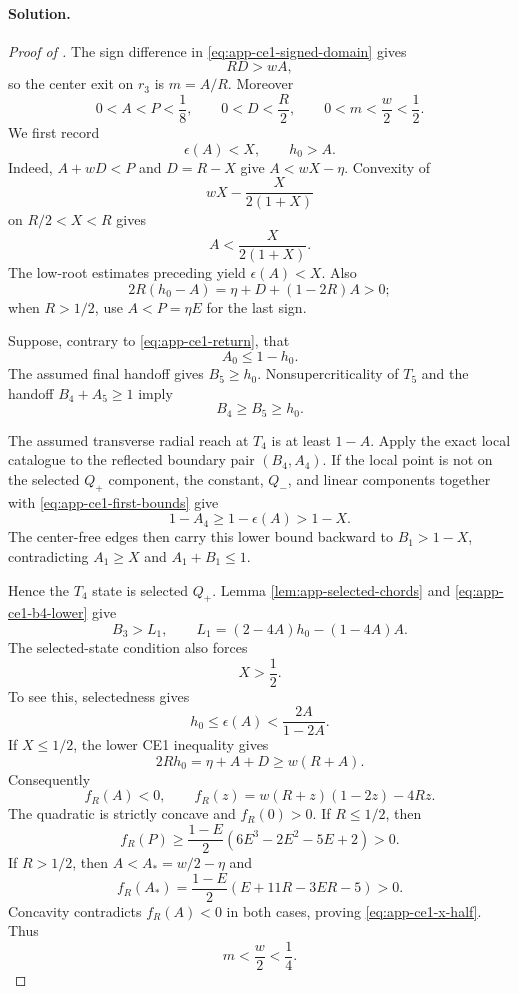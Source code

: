 

\paragraph{Solution.}

\begin{proof}[Proof of ]
The sign difference in \eqref{eq:app-ce1-signed-domain} gives
\[
 RD>wA,
\]
so the center exit on $r_3$ is $m=A/R$.  Moreover
\[
 0<A<P<\frac18,
 \qquad 0<D<\frac R2,
 \qquad 0<m<\frac w2<\frac12.
 \label{eq:app-ce1-elementary-bounds}
\]
We first record
\[
 \epsilon(A)<X,
 \qquad h_0>A.
 \label{eq:app-ce1-first-bounds}
\]
Indeed, $A+wD<P$ and $D=R-X$ give $A<wX-\eta$.  Convexity of
\[
 wX-\frac{X}{2(1+X)}
\]
on $R/2<X<R$ gives
\[
 A<\frac{X}{2(1+X)}.
\]
The low-root estimates preceding  yield
$\epsilon(A)<X$.  Also
\[
 2R(h_0-A)=\eta+D+(1-2R)A>0;
\]
when $R>1/2$, use $A<P=\eta E$ for the last sign.

Suppose, contrary to \eqref{eq:app-ce1-return}, that
\[
 A_0\le1-h_0.
 \label{eq:app-ce1-return-negation}
\]
The assumed final handoff gives $B_5\ge h_0$.
Nonsupercriticality of $T_5$ and the handoff $B_4+A_5\ge1$ imply
\[
 \boxed{B_4\ge B_5\ge h_0.}
 \label{eq:app-ce1-b4-lower}
\]

The assumed transverse radial reach at $T_4$ is at least $1-A$.  Apply the exact local
catalogue to the reflected boundary pair $(B_4,A_4)$.  If the local point is
not on the selected $Q_+$ component, the constant, $Q_-$, and linear
components together with \eqref{eq:app-ce1-first-bounds} give
\[
 1-A_4\ge1-\epsilon(A)>1-X.
\]
The center-free edges then carry this lower bound backward to
$B_1>1-X$, contradicting $A_1\ge X$ and
$A_1+B_1\le1$.

Hence the $T_4$ state is selected $Q_+$.  Lemma
\ref{lem:app-selected-chords} and \eqref{eq:app-ce1-b4-lower} give
\[
 B_3>L_1,
 \qquad
 L_1=(2-4A)h_0-(1-4A)A.
 \label{eq:app-ce1-l1}
\]
The selected-state condition also forces
\[
 \boxed{X>\frac12.}
 \label{eq:app-ce1-x-half}
\]
To see this, selectedness gives
\[
 h_0\le\epsilon(A)<\frac{2A}{1-2A}.
\]
If $X\le1/2$, the lower CE1 inequality gives
\[
 2Rh_0=\eta+A+D\ge w(R+A).
\]
Consequently
\[
 f_R(A)<0,
 \qquad
 f_R(z)=w(R+z)(1-2z)-4Rz.
\]
The quadratic is strictly concave and $f_R(0)>0$.  If $R\le1/2$, then
\[
 f_R(P)\ge\frac{1-E}{2}
 (6E^3-2E^2-5E+2)>0.
\]
If $R>1/2$, then $A<A_*=w/2-\eta$ and
\[
 f_R(A_*)=\frac{1-E}{2}(E+11R-3ER-5)>0.
\]
Concavity contradicts $f_R(A)<0$ in both cases, proving
\eqref{eq:app-ce1-x-half}.  Thus
\[
 m<\frac w2<\frac14.
 \label{eq:app-ce1-m-quarter}
\]


\end{proof}
